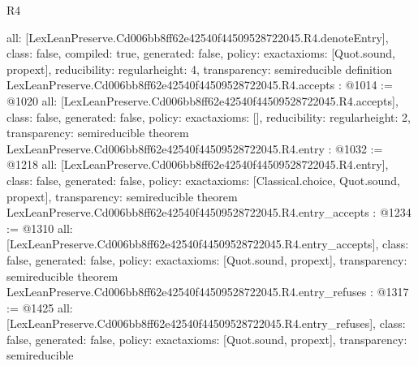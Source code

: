 \begin{lexlean}{R4}
\begin{coremodule}
{  all: [LexLeanPreserve.Cd006bb8ff62e42540f44509528722045.R4.denoteEntry],
  class: false,
  compiled: true,
  generated: false,
  policy: exact{axioms: [Quot.sound, propext]},
  reducibility: regular{height: 4},
  transparency: semireducible
}
definition LexLeanPreserve.Cd006bb8ff62e42540f44509528722045.R4.accepts : @1014 := @1020 {
  all: [LexLeanPreserve.Cd006bb8ff62e42540f44509528722045.R4.accepts],
  class: false,
  generated: false,
  policy: exact{axioms: []},
  reducibility: regular{height: 2},
  transparency: semireducible
}
theorem LexLeanPreserve.Cd006bb8ff62e42540f44509528722045.R4.entry : @1032 := @1218 {
  all: [LexLeanPreserve.Cd006bb8ff62e42540f44509528722045.R4.entry],
  class: false,
  generated: false,
  policy: exact{axioms: [Classical.choice, Quot.sound, propext]},
  transparency: semireducible
}
theorem LexLeanPreserve.Cd006bb8ff62e42540f44509528722045.R4.entry_accepts : @1234 := @1310 {
  all: [LexLeanPreserve.Cd006bb8ff62e42540f44509528722045.R4.entry_accepts],
  class: false,
  generated: false,
  policy: exact{axioms: [Quot.sound, propext]},
  transparency: semireducible
}
theorem LexLeanPreserve.Cd006bb8ff62e42540f44509528722045.R4.entry_refuses : @1317 := @1425 {
  all: [LexLeanPreserve.Cd006bb8ff62e42540f44509528722045.R4.entry_refuses],
  class: false,
  generated: false,
  policy: exact{axioms: [Quot.sound, propext]},
  transparency: semireducible
}


\end{coremodule}
\end{lexlean}
